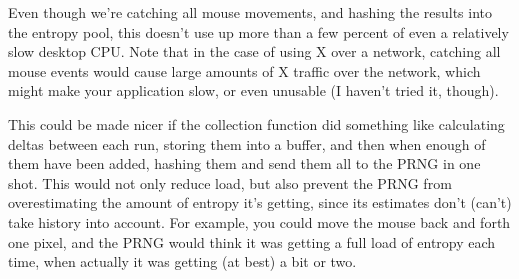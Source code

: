 \documentclass{article}
\begin{document}
Even though we're catching all mouse movements, and hashing the results into
the entropy pool, this doesn't use up more than a few percent of even a
relatively slow desktop CPU. Note that in the case of using X over a network,
catching all mouse events would cause large amounts of X traffic over the
network, which might make your application slow, or even unusable (I haven't
tried it, though).

This could be made nicer if the collection function did something like
calculating deltas between each run, storing them into a buffer, and then when
enough of them have been added, hashing them and send them all to the PRNG in
one shot. This would not only reduce load, but also prevent the PRNG from
overestimating the amount of entropy it's getting, since its estimates don't
(can't) take history into account. For example, you could move the mouse back
and forth one pixel, and the PRNG would think it was getting a full load of
entropy each time, when actually it was getting (at best) a bit or two.
\end{document}
